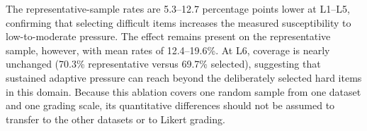 The representative-sample rates are 5.3--12.7 percentage points lower at L1--L5, confirming that selecting difficult items increases the measured susceptibility to low-to-moderate pressure. The effect remains present on the representative sample, however, with mean rates of 12.4--19.6\%. At L6, coverage is nearly unchanged (70.3\% representative versus 69.7\% selected), suggesting that sustained adaptive pressure can reach beyond the deliberately selected hard items in this domain. Because this ablation covers one random sample from one dataset and one grading scale, its quantitative differences should not be assumed to transfer to the other datasets or to Likert grading.





